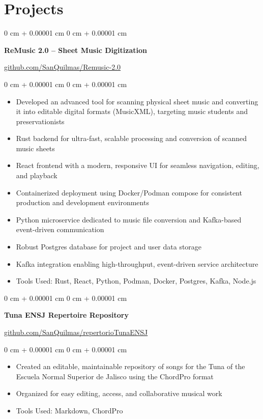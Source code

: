 \documentclass[10pt, letterpaper]{article}
\newenvironment{highlights}{
  \begin{itemize}[
        topsep=0.10 cm,
        parsep=0.10 cm,
        partopsep=0pt,
        itemsep=0pt,
        leftmargin=0 cm + 10pt
      ]
    }{
  \end{itemize}
} %
\newenvironment{onecolentry}{
  \begin{adjustwidth}{
      0 cm + 0.00001 cm
    }{
      0 cm + 0.00001 cm
    }
  }{
  \end{adjustwidth}
} %
\begin{document}
\section{Projects}
\begin{onecolentry}
    \textbf{ReMusic 2.0 – Sheet Music Digitization}
\end{onecolentry}
\vspace{0.05 cm}
\href{https://github.com/SanQuilmas/Remusic-2.0}{github.com/SanQuilmas/Remusic-2.0}
\vspace{0.10 cm}
\begin{onecolentry}
    \begin{highlights}
        \item Developed an advanced tool for scanning physical sheet music and converting it into editable digital formats (MusicXML), targeting music students and preservationists
        \item Rust backend for ultra-fast, scalable processing and conversion of scanned music sheets
        \item React frontend with a modern, responsive UI for seamless navigation, editing, and playback
        \item Containerized deployment using Docker/Podman compose for consistent production and development environments
        \item Python microservice dedicated to music file conversion and Kafka-based event-driven communication
        \item Robust Postgres database for project and user data storage
        \item Kafka integration enabling high-throughput, event-driven service architecture
        \item Tools Used: Rust, React, Python, Podman, Docker, Postgres, Kafka, Node.js
    \end{highlights}
\end{onecolentry}
\vspace{0.2 cm}
\begin{onecolentry}
    \textbf{Tuna ENSJ Repertoire Repository}
\end{onecolentry}
\vspace{0.05 cm}
\href{https://github.com/SanQuilmas/repertorioTunaENSJ}{github.com/SanQuilmas/repertorioTunaENSJ}
\vspace{0.10 cm}
\begin{onecolentry}
    \begin{highlights}
        \item Created an editable, maintainable repository of songs for the Tuna of the Escuela Normal Superior de Jalisco using the ChordPro format
        \item Organized for easy editing, access, and collaborative musical work
        \item Tools Used: Markdown, ChordPro
    \end{highlights}
\end{onecolentry}
\end{document}
